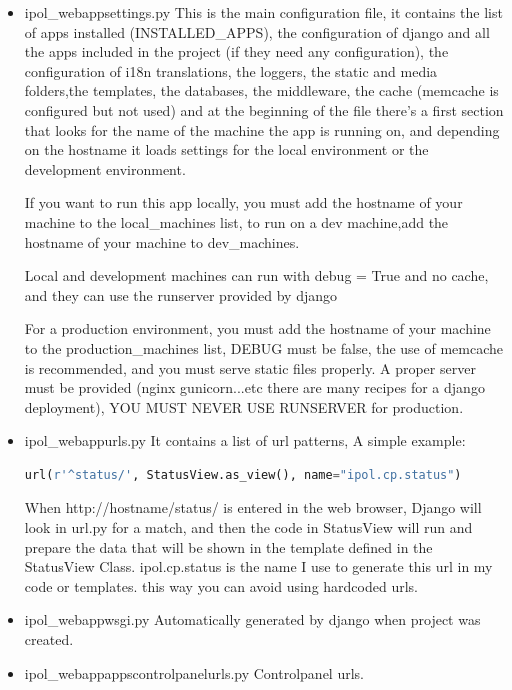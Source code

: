\begin{itemize}
\item  ipol\_webapp\/settings.py
This is the main configuration file, it contains the list of apps installed (INSTALLED\_APPS), the configuration of django and all the apps included in the project (if they need any configuration), the configuration of i18n translations, the loggers, the static and media folders,the templates, the databases, the middleware, the cache (memcache is configured but not used) and at the beginning of the file there's a first section that looks for the name of the machine the app is running on, and depending on the hostname it loads settings for the local environment or the development environment.

If you want to run this app locally, you must add the hostname of your machine to the local\_machines list, 
to run on a dev machine,add the hostname of your machine to dev\_machines.

Local and development machines can run with debug = True and no cache, and they can use the runserver provided by django

For a production environment, you must add the hostname of your machine to the production\_machines list,  DEBUG must be false, the use of memcache is recommended, and you must serve static files properly. A proper server must be provided (nginx gunicorn...etc there are many recipes for a django deployment), YOU MUST NEVER USE RUNSERVER for production.
 

\item  ipol\_webapp\/urls.py
It contains a list of url patterns, 
A simple example:
\begin{lstlisting}[language=Python,firstnumber=1]
url(r'^status/', StatusView.as_view(), name="ipol.cp.status")
\end{lstlisting}
When http://hostname/status/ is entered in the web browser, Django will look in url.py for a match, and then the code in StatusView will run and prepare the data that will be shown in the template defined in the StatusView Class.
ipol.cp.status is the name I use to generate this url in my code or templates. this way you can avoid using hardcoded urls.

\item  ipol\_webapp\/wsgi.py
Automatically generated by django when project was created.

\item  ipol\_webapp\/apps\/controlpanel\/urls.py
Controlpanel urls.


\end{itemize}

